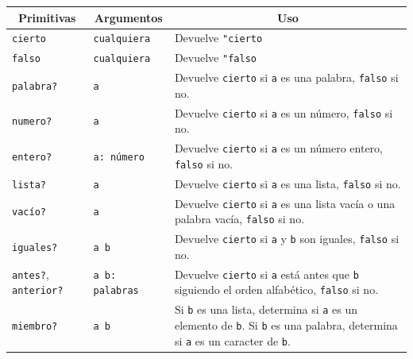 \begin{center} \begin{longtable}{|m{3cm}|m{3cm}|m{9cm}|} \hline 
   \multicolumn{1}{|c|}{\textbf{Primitivas}} & 
      \multicolumn{1}{c|}{\textbf{Argumentos}} & 
         \multicolumn{1}{c|}{\textbf{Uso}} \\ \endhead \hline 
   \texttt{cierto} \index{cierto@\texttt{cierto}} & \texttt{cualquiera} &
        Devuelve \verb+"cierto+ \\ \hline 
   \texttt{falso} \index{falso@\texttt{falso}} & \texttt{cualquiera} &
        Devuelve \texttt{"falso} \\ \hline \hline 
   \texttt{palabra?} \index{palabra?@\texttt{palabra?}} & \texttt{a} &
        Devuelve \texttt{cierto} si \texttt{a} es una palabra, \texttt{falso}
        si no. \\ \hline 
   \texttt{numero?} \index{numero?@\texttt{numero?}} & \texttt{a} &
        Devuelve \texttt{cierto} si \texttt{a} es un n\'umero, \texttt{falso}
        si no. \\ \hline 
   \texttt{entero?} \index{entero?@\texttt{entero?}} & \texttt{a: n\'umero} &
        Devuelve \texttt{cierto} si \texttt{a} es un n\'umero entero,
        \texttt{falso} si no. \\ \hline 
   \texttt{lista?} \index{lista?@\texttt{lista?}} & \texttt{a} &
        Devuelve \texttt{cierto} si \texttt{a} es una lista, \texttt{falso}
        si no. \\ \hline 
   \texttt{vac\'io?} \index{vac\'io?@\texttt{vac\'io?}} & \texttt{a} &
        Devuelve \texttt{cierto} si \texttt{a} es una lista vac\'ia o una
        palabra vac\'ia, \texttt{falso} si no. \\ \hline 
   \texttt{iguales?} \index{iguales?@\texttt{iguales?}} & \texttt{a b} &
        Devuelve \texttt{cierto} si \texttt{a} y \texttt{b} son iguales,
        \texttt{falso} si no. \\ \hline 
   \texttt{antes?},\index{antes?@\texttt{antes?}} 
     \texttt{anterior?}\index{anterior?@\texttt{anterior?}}&
        \texttt{a b: palabras}&
        Devuelve \texttt{cierto} si \texttt{a} est\'a antes que \texttt{b}
        siguiendo el orden alfab\'etico, \texttt{falso} si no. \\ \hline 
   \texttt{miembro?} \index{miembro?@\texttt{miembro?}} & \texttt{a b} &
        Si \texttt{b} es una lista, determina si \texttt{a} es un elemento
        de \texttt{b}. Si \texttt{b} es una palabra, determina si \texttt{a}
        es un caracter de \texttt{b}. \\ \hline 

\end{longtable}
\end{center}
